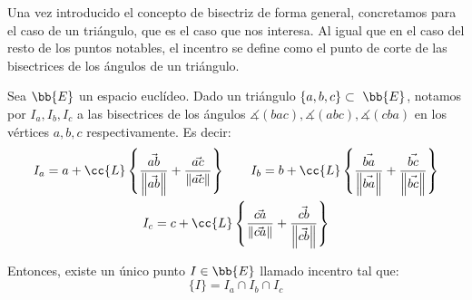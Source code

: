 Una vez introducido el concepto de bisectriz de forma general, concretamos para el caso de un triángulo, que es el caso que nos interesa. Al igual que
en el caso del resto de los puntos notables, el incentro se define como el punto de corte de las bisectrices de los ángulos de un triángulo.
\begin{teo}[Incentro]\label{teo:incentro}
    Sea $\bb{E}$ un espacio euclídeo. Dado un triángulo $\{a,b,c\}\subset~\bb{E}$, notamos por $I_a,I_b,I_c$ a las bisectrices de los ángulos
    $\measuredangle(bac),\measuredangle(abc),\measuredangle(cba)$ en los vértices $a,b,c$ respectivamente. Es decir:
    \begin{gather*}
        I_a = a + \cc{L}\left\{\frac{\vec{ab}}{\left\|\vec{ab}\right\|} + \frac{\vec{ac}}{\left\|\vec{ac}\right\|}\right\} \qquad
        I_b = b + \cc{L}\left\{\frac{\vec{ba}}{\left\|\vec{ba}\right\|} + \frac{\vec{bc}}{\left\|\vec{bc}\right\|}\right\} \\
        I_c = c + \cc{L}\left\{\frac{\vec{ca}}{\left\|\vec{ca}\right\|} + \frac{\vec{cb}}{\left\|\vec{cb}\right\|}\right\}
    \end{gather*}
    
    Entonces, existe un único punto $I\in \bb{E}$ llamado incentro tal que:
    \begin{equation*}
        \{I\} = I_a\cap I_b \cap I_c
    \end{equation*}

    \begin{figure}[H]
        \centering
\end{figure}
\end{teo}
